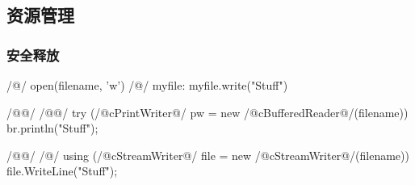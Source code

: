 \documentclass[hidelinks]{ctexart}
\begin{document}
\subsection{资源管理} %
\label{sub:资源管理}

\subsubsection{安全释放} %
\label{ssub:安全释放}

\begin{pylst}
/@\pywith@/ open(filename, 'w') /@\pyas@/ myfile:
    myfile.write("Stuff")
\end{pylst}
\begin{javalst}
/@@/
/@\lhend @/
try (/@\+c{PrintWriter}@/ pw = new /@\+c{BufferedReader}@/(filename)) {
    br.println("Stuff");
}
\end{javalst}
\begin{cshlst}
/@@/
/@\lhend@/
using (/@\+c{StreamWriter}@/ file = new /@\+c{StreamWriter}@/(filename))
{
    file.WriteLine("Stuff");
}
\end{cshlst}



\end{document}

